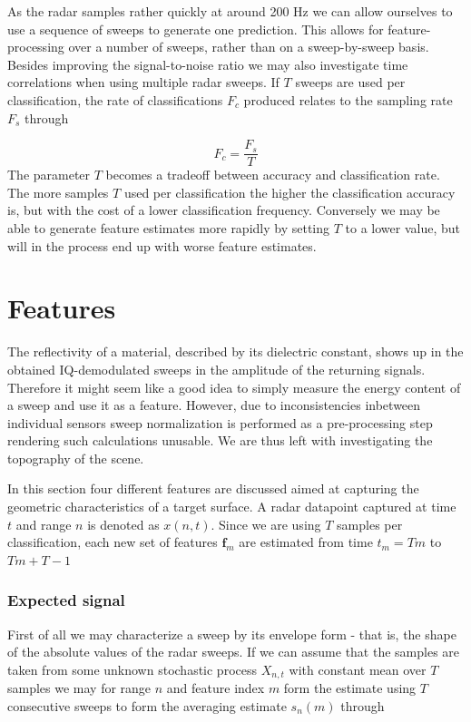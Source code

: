 As the radar samples rather quickly at around 200 Hz we can allow ourselves to use a sequence of sweeps to generate one prediction. This allows for feature-processing over a number of sweeps, rather than on a sweep-by-sweep basis. Besides improving the signal-to-noise ratio \citep{w_doerry_2016} we may also investigate time correlations when using multiple radar sweeps. If $T$ sweeps are used per classification, the rate of classifications $F_c$ produced relates to the sampling rate $F_s$ through

\begin{equation}
	F_c = \frac{F_s}{T}
\end{equation} 
The parameter $T$ becomes a tradeoff between accuracy and classification rate. The more samples $T$ used per classification the higher the classification accuracy is, but with the cost of a lower classification frequency. Conversely we may be able to generate feature estimates more rapidly by setting $T$ to a lower value, but will in the process end up with worse feature estimates. 

\section{Features}

The reflectivity of a material, described by its dielectric constant, shows up in the obtained IQ-demodulated sweeps in the amplitude of the returning signals. Therefore it might seem like a good idea to simply measure the energy content of a sweep and use it as a feature. However, due to inconsistencies inbetween individual sensors sweep normalization is performed as a pre-processing step rendering such calculations unusable. We are thus left with investigating the topography of the scene. 

In this section four different features are discussed aimed at capturing the geometric characteristics of a target surface. A radar datapoint captured at time $t$ and range $n$ is denoted as $x(n,t)$. Since we are using $T$ samples per classification, each new set of features $\mathbf{f}_m$ are estimated from time $t_m=Tm$ to $Tm+T-1$ 

\subsubsection{Expected signal}

First of all we may characterize a sweep by its envelope form - that is, the shape of the absolute values of the radar sweeps. If we can assume that the samples are taken from some unknown stochastic process $X_{n,t}$ with constant mean over $T$ samples we may for range $n$ and feature index $m$ form the estimate using $T$ consecutive sweeps to form the averaging estimate $s_n(m)$ through


